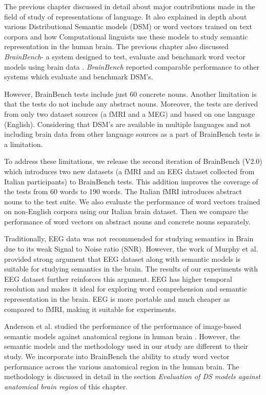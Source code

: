 \label{chapter:newsol}

The previous chapter discussed in detail about major contributions made in the field of study of representations of language. It also explained in depth about various Distributional Semantic models (DSM) or word vectors trained on text corpora and how Computational linguists use these models to study semantic representation in the human brain. The previous chapter also discussed \textit{BrainBench}- a system designed to test, evaluate and benchmark word vector models using brain data \cite{BrainBench2016}. \textit{BrainBench} reported comparable performance to other systems which evaluate and benchmark DSM's.

However, BrainBench tests include just 60 concrete nouns. Another limitation is that the tests do not include any abstract nouns. Moreover, the tests are derived from only two dataset sources (a fMRI and a MEG) and based on one language (English). Considering that DSM's are available in multiple languages and not including brain data from other language sources as a part of BrainBench tests is a limitation. 

To address these limitations, we release the second iteration of BrainBench (V2.0) which introduces two new datasets (a fMRI and an EEG dataset collected from Italian participants) to BrainBench tests. This addition improves the coverage of the tests from 60 words to 190 words. The Italian fMRI introduces abstract nouns to the test suite. We also evaluate the performance of word vectors trained on non-English corpora using our Italian brain dataset. Then we compare the performance of word vectors on abstract nouns and concrete nouns separately. 

Traditionally, EEG data was not recommended for studying semantics in Brain due to its weak Signal to Noise ratio (SNR). However, the work of Murphy et al. \cite{MurphyEEG} provided strong argument that EEG dataset along with semantic models is suitable for studying semantics in the brain. The results of our experiments with EEG dataset further reinforces this argument. EEG has higher temporal resolution and makes it ideal for exploring word comprehension and semantic representation in the brain. EEG is more portable and much cheaper as compared to fMRI, making it suitable for experiments.


Anderson et al. studied the performance of the performance of image-based semantic models against anatomical regions in human brain \cite{andersonBrainEyes}. However, the semantic models and the methodology used in our study are different to their study. We incorporate into BrainBench the ability to study word vector performance across the various anatomical region in the human brain. The methodology is discussed in detail in the section \textit{Evaluation of DS models against anatomical brain region} of this chapter.

